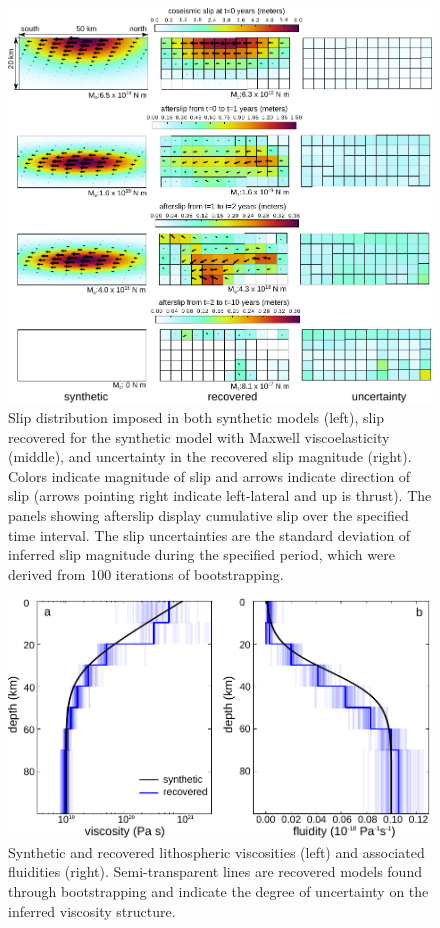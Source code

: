 \documentclass[extra,mreferee]{gji}
\begin{document}
\begin{figure}\label{figure3}
  \centering
  \includegraphics{figures/Fig3.pdf}
  \caption{Slip distribution imposed in both synthetic models (left),
    slip recovered for the synthetic model with Maxwell
    viscoelasticity (middle), and uncertainty in the recovered slip
    magnitude (right).  Colors indicate magnitude of slip and arrows
    indicate direction of slip (arrows pointing right indicate
    left-lateral and up is thrust).  The panels showing afterslip
    display cumulative slip over the specified time interval.  The
    slip uncertainties are the standard deviation of inferred slip
    magnitude during the specified period, which were derived from 100
    iterations of bootstrapping.}
  \label{Figure 3}
\end{figure}

\begin{figure}\label{figure4}
  \centering
  \includegraphics{figures/Fig4.pdf}
  \caption{Synthetic and recovered lithospheric viscosities (left)
    and associated fluidities (right).  Semi-transparent lines are recovered
    models found through bootstrapping and indicate the degree of
    uncertainty on the inferred viscosity structure.}
  \label{Figure 4}
\end{figure}
\end{document}
